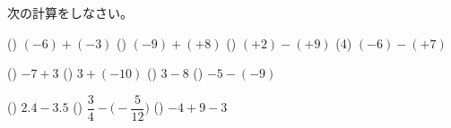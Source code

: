 \documentclass[
  12pt,a4paper,lualatex,ja=standard]{bxjsarticle}
\begin{document}
\newcommand{\kuran}[1]{\framebox[1.5cm][c]{\maru{\kana}}}
\newcommand{\sukuran}[1]{\framebox[1.5cm][c]{\maru{\kurankaunta}}}

\newcommand{\degre}{\ensuremath{^\circ}}

\newcommand{\myarc}[1]{
   \tikz [baseline = (N.base), every node/.style={}] {
      \node [inner sep = 0pt] (N) {$\mathrm{#1}$};
      \draw [line width = 0.4pt] plot [smooth, tension=1.3] coordinates {
         ($(N.north west) + (0.1ex,0)$)
         ($(N.north)      + (0,0.5ex)$)
         ($(N.north east) + (0,0)$)
      };
   }
}

\makeatletter
\newenvironment{figurehere}{\def\@captype{figure}}{}
\makeatother

\newcommand{\haiten}[1]{%
\begin{flushright}%
\hogetnotesize{＜#1＞}%
\end{flushright}%
}

\newcommand{\goku}[1]{\fbox{\phantom{\text{#1}} \quad}}


\noindent{} \hspace{1pt} 次の計算をしなさい。

()\hspace{2.5pt} \((-6) +(-3)\)
\hfill ()\hspace{2.5pt} \((-9)+(+8)\)
\hfill ()\hspace{2.5pt} \((+2) - (+9)\) \hfill (4)
\((-6) - (+7)\)

\vfill

()\hspace{2.5pt} \(-7 +3\)
\hfill ()\hspace{2.5pt} \(3 +(-10)\)
\hfill ()\hspace{2.5pt} \(3 -8\)
\hfill ()\hspace{2.5pt} \(-5 - (-9)\)

\vfill

()\hspace{2.5pt} \(2.4 - 3.5\) \hfill 
()\hspace{2.5pt} \(\dfrac{3}{4} - \biggl( -\dfrac{5}{12} \biggl)\)
\hfill  ()\hspace{2.5pt} \(-4 + 9 -3\) \hfill 
\end{document}
